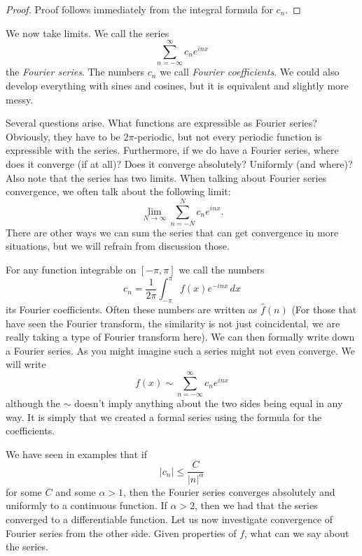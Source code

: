 \documentclass[12pt]{book}
\newcommand{\abs}[1]{\left\lvert {#1} \right\rvert}
\theoremstyle{plain}
\theoremstyle{remark}
\theoremstyle{definition}
\theoremstyle{exercise}
\theoremstyle{example}
\begin{document}
\medskip

\begin{proof}
Proof follows immediately from the integral formula for $c_n$.
\end{proof}

\medskip

We now take limits.  We call the series
$$
\sum_{n=-\infty}^\infty c_n e^{inx}
$$
the \emph{Fourier series}.  The numbers $c_n$
we call \emph{Fourier coefficients}.  We could also develop everything with
sines and cosines, but it is equivalent and slightly more messy.

\medskip

Several questions arise.  What functions are expressible as 
Fourier series?  Obviously, they have to be $2\pi$-periodic, but not every
periodic function is expressible with the series.  Furthermore, if we do have
a Fourier series, where does it converge (if at all)?  Does it converge
absolutely?  Uniformly (and where)?  Also note that the series has two
limits.  When talking about Fourier series convergence, we often
talk about the following limit:
$$
\lim_{N\to\infty} 
\sum_{n=-N}^N c_n e^{inx} .
$$
There are other ways we can sum the series that can get convergence in more
situations, but we will refrain from discussion those.

For any function integrable on $[-\pi,\pi]$ we call the numbers
$$
c_n = 
\frac{1}{2\pi} \int_{-\pi}^\pi
f(x) e^{-inx} \, dx
$$
its Fourier coefficients.  Often these numbers are
written as $\hat{f}(n)$ (For those that have seen the Fourier transform,
the similarity is not just
coincidental, we are really taking a type of Fourier transform here).
We can then formally write down a Fourier series.
As you might imagine such a series might not even converge.
We will write
$$
f(x) \sim
\sum_{n=-\infty}^\infty c_n e^{inx}
$$
although the $\sim$ doesn't imply anything about the two sides being equal
in any way.  It is simply that we created a formal series using the formula
for the coefficients.

\medskip

We have seen in examples that if
$$
\abs{c_n} 
\leq \frac{C}{\abs{n}^\alpha}
$$
for some $C$ and some $\alpha > 1$, then the Fourier series
converges absolutely and uniformly to a continuous function.
If $\alpha > 2$, then we had that the series converged to a differentiable
function.
Let us now investigate convergence of Fourier series from the other side.
Given properties of $f$, what can we say about the series.
\end{document}
